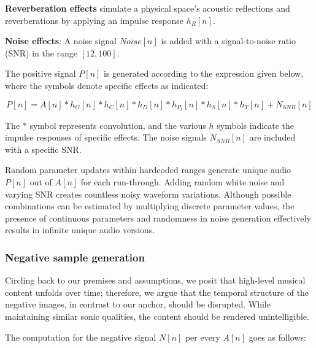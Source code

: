 \textbf{Reverberation effects} simulate a physical space's acoustic reflections and reverberations by applying an impulse response $h_R[n]$.

\textbf{Noise effects}: A noise signal $Noise[n]$ is added with a signal-to-noise ratio (SNR) in the range $[12, 100]$.

The positive signal $P[n]$ is generated according to the expression given below, where the symbols denote specific effects as indicated:

\begin{equation}\label{eq:positive_signal}
P[n] = A[n] \ast h_{G}[n] \ast h_{C}[n] \ast h_{D}[n] \ast h_{P_t}[n] \ast h_{S}[n] \ast h_{T}[n] + N_{SNR}[n]
\end{equation}

The $\ast$ symbol represents convolution, and the various $h$ symbols indicate the impulse responses of specific effects. The noise signals $N_{SNR}[n]$ are included with a specific SNR.

Random parameter updates within hardcoded ranges generate unique audio $P[n]$ out of $A[n]$ for each run-through. Adding random white noise and varying SNR creates countless noisy waveform variations. Although possible combinations can be estimated by multiplying discrete parameter values, the presence of continuous parameters and randomness in noise generation effectively results in infinite unique audio versions.

\subsubsection{Negative sample generation}

Circling back to our premises and assumptions, we posit that high-level musical content unfolds over time; therefore, we argue that the temporal structure of the negative images, in contrast to our anchor, should be disrupted. While maintaining similar sonic qualities, the content should be rendered unintelligible.

The computation for the negative signal $N[n]$ per every $A[n]$ goes as follows:

